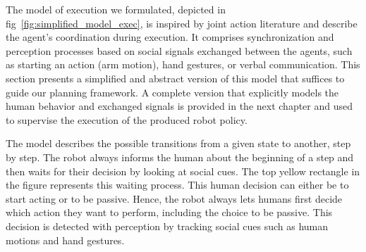 
The model of execution we formulated, depicted in fig~\ref{fig:simplified_model_exec}, is inspired by joint action literature and describe the agent's coordination during execution. It comprises synchronization and perception processes based on social signals exchanged between the agents, such as starting an action (arm motion), hand gestures, or verbal communication. This section presents a simplified and abstract version of this model that suffices to guide our planning framework. A complete version that explicitly models the human behavior and exchanged signals is provided in the next chapter and used to supervise the execution of the produced robot policy.  



The model describes the possible transitions from a given state to another, step by step. The robot always informs the human about the beginning of a step and then waits for their decision by looking at social cues. The top yellow rectangle in the figure represents this waiting process. This human decision can either be to start acting or to be passive. Hence, the robot always lets humans first decide which action they want to perform, including the choice to be passive. This decision is detected with perception by tracking social cues such as human motions and hand gestures.

